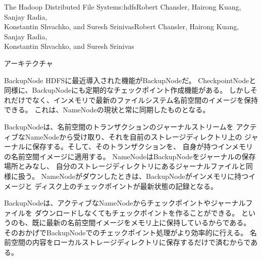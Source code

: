 \begin{aosachaptertoc}{The Hadoop Distributed File System}{s:hdfs}{Robert Chansler, Hairong Kuang, Sanjay Radia, \\ Konstantin Shvachko, and Suresh Srinivas}{Robert Chansler, Hairong Kuang, Sanjay Radia, \\ \hspace*{0.9cm} Konstantin Shvachko, and Suresh Srinivas}
\begin{aosasect1}{アーキテクチャ}
\begin{aosasect2}{BackupNode}
HDFSに最近導入された機能がBackupNodeだ。
CheckpointNodeと同様に、BackupNodeにも定期的なチェックポイント作成機能がある。
しかしそれだけでなく、インメモリで最新のファイルシステム名前空間のイメージを保持できる。
これは、NameNodeの現状と常に同期したものとなる。

BackupNodeは、名前空間のトランザクションのジャーナルストリームを
アクティブなNameNodeから受け取り、それを自前のストレージディレクトリ上の
ジャーナルに保存する。そして、そのトランザクションを、
自身が持つインメモリの名前空間イメージに適用する。
NameNodeはBackupNodeをジャーナルの保存場所とみなし、
自分のストレージディレクトリにあるジャーナルファイルと同様に扱う。
NameNodeがダウンしたときは、BackupNodeがインメモリに持つイメージと
ディスク上のチェックポイントが最新状態の記録となる。

BackupNodeは、アクティブなNameNodeからチェックポイントやジャーナルファイルを
ダウンロードしなくてもチェックポイントを作ることができる。
というのも、既に最新の名前空間イメージをメモリ上に保持しているからである。
そのおかげでBackupNodeでのチェックポイント処理がより効率的に行える。
名前空間の内容をローカルストレージディレクトリに保存するだけで済むからである。


\end{aosasect2}
\end{aosasect1}
\end{aosachaptertoc}
